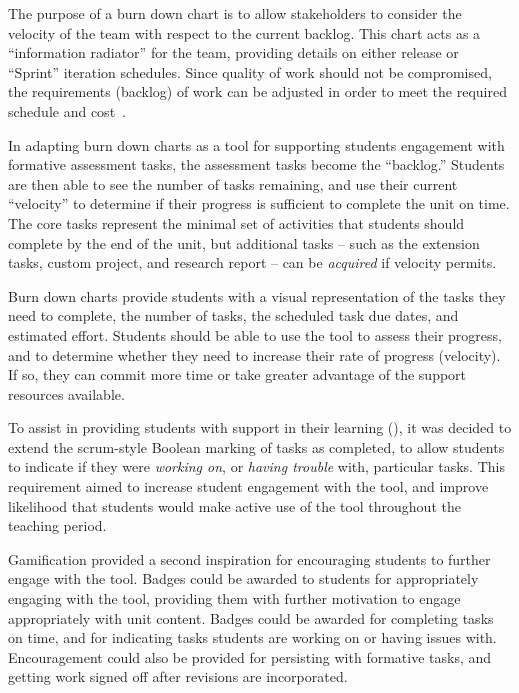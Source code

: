 The purpose of a burn down chart is to allow stakeholders to consider the velocity of the team with respect to the current backlog. This chart acts as a ``information radiator'' \cite{Cockburn:2002} for the team, providing details on either release or ``Sprint'' iteration schedules. Since quality of work should not be compromised, the requirements (backlog) of work can be adjusted in order to meet the required schedule and cost~\cite{Sutherland:2007}.

In adapting burn down charts as a tool for supporting students engagement with formative assessment tasks, the assessment tasks become the ``backlog.'' Students are then able to see the number of tasks remaining, and use their current ``velocity'' to determine if their progress is sufficient to complete the unit on time. The core tasks represent the minimal set of activities that students should complete by the end of the unit, but additional tasks -- such as the extension tasks, custom project, and research report -- can be \emph{acquired} if velocity permits.

Burn down charts provide students with a visual representation of the tasks they need to complete, the number of tasks, the scheduled task due dates, and estimated effort. Students should be able to use the tool to assess their progress, and to determine whether they need to increase their rate of progress (velocity). If so, they can commit more time or take greater advantage of the support resources available. 

To assist in providing students with support in their learning (), it was decided to extend the scrum-style Boolean marking of tasks as completed, to allow students to indicate if they were \emph{working on}, or \emph{having trouble} with, particular tasks. This requirement aimed to increase student engagement with the tool, and improve likelihood that students would make active use of the tool throughout the teaching period.

Gamification \cite{Deterding:2011} provided a second inspiration for encouraging students to further engage with the tool. Badges could be awarded to students for appropriately engaging with the tool, providing them with further motivation to engage appropriately with unit content. Badges could be awarded for completing tasks on time, and for indicating tasks students are working on or having issues with. Encouragement could also be provided for persisting with formative tasks, and getting work signed off after revisions are incorporated.

